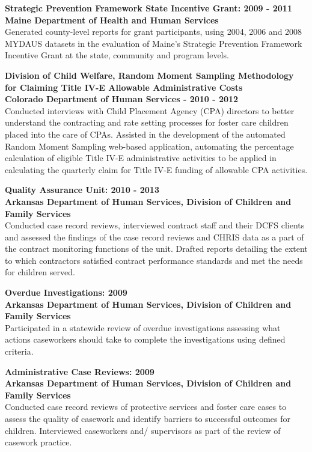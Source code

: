 \documentclass[line, margin, 10pt]{res}
\begin{document}
\begin{resume}
  {\bf Strategic Prevention Framework State Incentive Grant: 2009 - 2011} \\
  {\bf Maine Department of Health and Human Services} \\
  Generated county-level reports for grant participants, using 2004,
  2006 and 2008 MYDAUS datasets in the evaluation of Maine's Strategic
  Prevention Framework Incentive Grant at the state, community and
  program levels.

  {\bf Division of Child Welfare, Random Moment Sampling Methodology
    for Claiming Title IV-E Allowable Administrative Costs} \\
  {\bf Colorado Department of Human Services - 2010 - 2012} \\
  Conducted interviews with Child Placement Agency (CPA) directors to
  better understand the contracting and rate setting processes for
  foster care children placed into the care of CPAs. Assisted in the
  development of the automated Random Moment Sampling web-based
  application, automating the percentage calculation of eligible Title
  IV-E administrative activities to be applied in calculating the
  quarterly claim for Title IV-E funding of allowable CPA
  activities.

  {\bf Quality Assurance Unit: 2010 - 2013} \\
  {\bf Arkansas Department of Human Services, Division of Children and
    Family Services} \\
  Conducted case record reviews, interviewed contract staff and their
  DCFS clients and assessed the findings of the case record reviews
  and CHRIS data as a part of the contract monitoring functions of the
  unit. Drafted reports detailing the extent to which contractors
  satisfied contract performance standards and met the needs for
  children served.

  {\bf Overdue Investigations: 2009} \\
  {\bf Arkansas Department of Human Services, Division of Children and Family
    Services} \\
  Participated in a statewide review of overdue investigations assessing what actions
  caseworkers should take to complete the investigations using defined
  criteria.

  {\bf Administrative Case Reviews: 2009} \\
  {\bf Arkansas Department of Human Services, Division of Children and
    Family Services} \\
  Conducted case record reviews of protective services and foster care
  cases to assess the quality of casework and identify barriers to
  successful outcomes for children. Interviewed caseworkers and/
  supervisors as part of the review of casework practice.


\end{resume}
\end{document}
